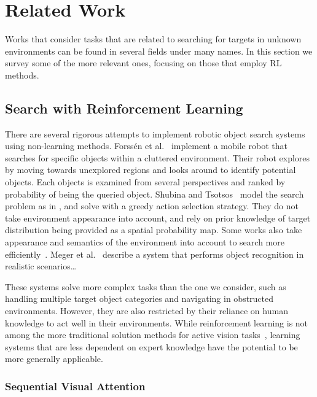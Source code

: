 \section{Related Work}
\label{sec:relatedwork}

Works that consider tasks that are related to searching for targets in unknown environments can be found in several fields under many names.
In this section we survey some of the more relevant ones, focusing on those that employ RL methods.

\subsection{Search with Reinforcement Learning}

There are several rigorous attempts to implement robotic object search systems using non-learning methods.
Forssén et al.~\cite{forssen_visual_2008} implement a mobile robot that searches for specific objects within a cluttered environment.
Their robot explores by moving towards unexplored regions and looks around to identify potential objects.
Each objects is examined from several perspectives and ranked by probability of being the queried object.
Shubina and Tsotsos~\cite{shubina_visualsearch_2010} model the search problem as in \cite{ye_tsotsos_2001}, and solve with a greedy action selection strategy.
They do not take environment appearance into account, and rely on prior knowledge of target distribution being provided as a spatial probability map.
Some works also take appearance and semantics of the environment into account to search more efficiently~\cite{aydemir_real_2011,aydemir_active_2013}.
Meger et al.~\cite{meger_george_2008} describe a system that performs object recognition in realistic scenarios\dots


These systems solve more complex tasks than the one we consider, such as handling multiple target object categories and navigating in obstructed environments.
However, they are also restricted by their reliance on human knowledge to act well in their environments.
While reinforcement learning is not among the more traditional solution methods for active vision tasks~\cite{chen_activevisionsurvey_2011},
learning systems that are less dependent on expert knowledge have the potential to be more generally applicable.

\subsubsection{Sequential Visual Attention}

